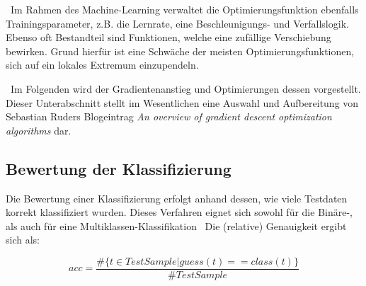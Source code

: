 ~\newline Im Rahmen des Machine-Learning verwaltet die Optimierungsfunktion ebenfalls Trainingsparameter, z.B. die Lernrate, eine Beschleunigungs- und Verfallslogik. Ebenso oft Bestandteil sind Funktionen, welche eine zufällige Verschiebung bewirken. Grund hierfür ist eine Schwäche der meisten Optimierungsfunktionen, sich auf ein lokales Extremum einzupendeln.

~\newline Im Folgenden wird der Gradientenanstieg und Optimierungen dessen vorgestellt. Dieser Unterabschnitt stellt im Wesentlichen eine Auswahl und Aufbereitung von Sebastian Ruders Blogeintrag \textit{An overview of gradient descent optimization algorithms} \cite{OptimizationFunction} dar.
\subsection{Bewertung der Klassifizierung}
Die Bewertung einer Klassifizierung erfolgt anhand dessen, wie viele Testdaten korrekt klassifiziert wurden. Dieses Verfahren eignet sich sowohl für die Binäre-, als auch für eine Multiklassen-Klassifikation
~\newline Die (relative) Genauigkeit ergibt sich als: 

\begin{equation}
	acc = \dfrac{\#\{t \in  TestSample | guess(t)==class(t)\}}{\#TestSample}
\end{equation}